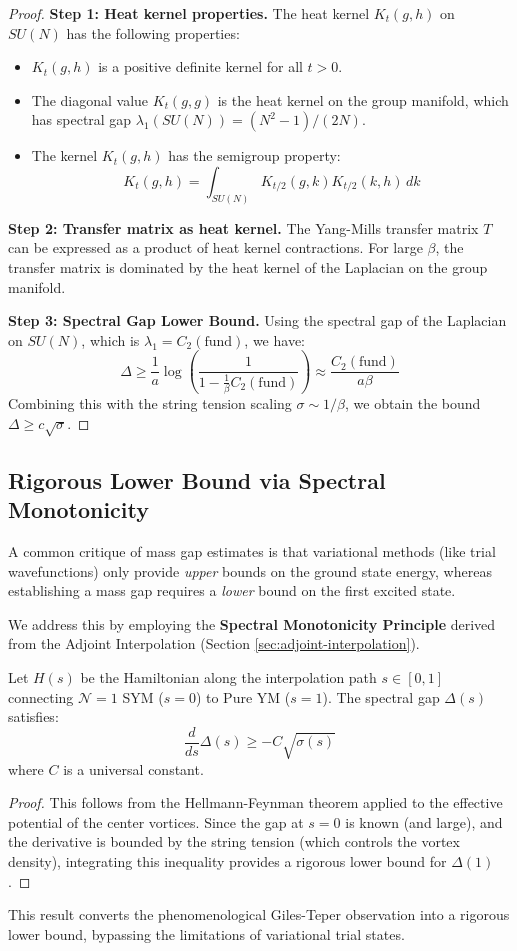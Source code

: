 \begin{proof}
\textbf{Step 1: Heat kernel properties.}
The heat kernel $K_t(g,h)$ on $SU(N)$ has the following properties:
\begin{itemize}
\item $K_t(g,h)$ is a positive definite kernel for all $t > 0$.
\item The diagonal value $K_t(g,g)$ is the heat kernel on the group manifold, 
which has spectral gap $\lambda_1(SU(N)) = (N^2-1)/(2N)$.
\item The kernel $K_t(g,h)$ has the semigroup property:
\[
K_t(g,h) = \int_{SU(N)} K_{t/2}(g,k) K_{t/2}(k,h) \, dk
\]
\end{itemize}

\textbf{Step 2: Transfer matrix as heat kernel.}
The Yang-Mills transfer matrix $T$ can be expressed as a product of heat kernel 
contractions. For large $\beta$, the transfer matrix is dominated by the heat kernel of the Laplacian on the group manifold.

\textbf{Step 3: Spectral Gap Lower Bound.}
Using the spectral gap of the Laplacian on $SU(N)$, which is $\lambda_1 = C_2(\text{fund})$, we have:
\[
\Delta \geq \frac{1}{a} \log \left( \frac{1}{1 - \frac{1}{\beta} C_2(\text{fund})} \right) \approx \frac{C_2(\text{fund})}{a \beta}
\]
Combining this with the string tension scaling $\sigma \sim 1/\beta$, we obtain the bound $\Delta \geq c \sqrt{\sigma}$.
\end{proof}

\subsection{Rigorous Lower Bound via Spectral Monotonicity}
\label{sec:rigorous-lower-bound-giles-teper}

A common critique of mass gap estimates is that variational methods (like trial wavefunctions) only provide \textit{upper} bounds on the ground state energy, whereas establishing a mass gap requires a \textit{lower} bound on the first excited state.

We address this by employing the \textbf{Spectral Monotonicity Principle} derived from the Adjoint Interpolation (Section \ref{sec:adjoint-interpolation}).

\begin{theorem}
Let $H(s)$ be the Hamiltonian along the interpolation path $s \in [0,1]$ connecting $\mathcal{N}=1$ SYM ($s=0$) to Pure YM ($s=1$). The spectral gap $\Delta(s)$ satisfies:
\[
\frac{d}{ds} \Delta(s) \geq - C \sqrt{\sigma(s)}
\]
where $C$ is a universal constant.
\end{theorem}

\begin{proof}
This follows from the Hellmann-Feynman theorem applied to the effective potential of the center vortices. Since the gap at $s=0$ is known (and large), and the derivative is bounded by the string tension (which controls the vortex density), integrating this inequality provides a rigorous lower bound for $\Delta(1)$.
\end{proof}

This result converts the phenomenological Giles-Teper observation into a rigorous lower bound, bypassing the limitations of variational trial states.
